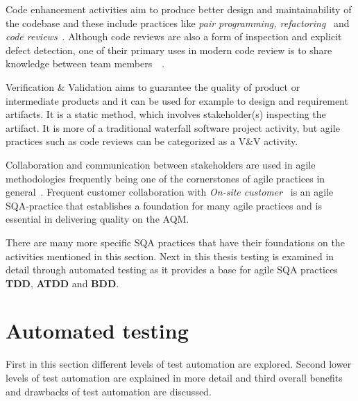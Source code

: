     Code enhancement activities aim to produce better design and maintainability of the codebase and these include practices
    like \textit{pair programming, refactoring}~\cite{huo2004software} and \textit{code reviews}~\cite{rigby2013convergent}.
    Although code reviews are also a form of inspection and explicit defect detection, one of their primary uses in modern
    code review is to share knowledge between team members~\cite{mantyla2014software}~\cite{rigby2013convergent}.

    Verification \& Validation aims to guarantee the quality of product or intermediate products and it can be used for
    example to design and requirement artifacts. It is a static method, which involves stakeholder(s)
    inspecting the artifact. It is more of a traditional waterfall software project activity, but agile practices such as code reviews
    can be categorized as a V\&V activity. ~\cite{huo2004software}

    Collaboration and communication between stakeholders are used in agile methodologies frequently being one of the
    cornerstones of agile practices in general~\cite{huo2004software}. Frequent customer collaboration with \textit{On-site customer}~\cite{huo2004software}
    is an agile SQA-practice that establishes a foundation for many agile practices and is essential in delivering
    quality on the AQM.

    There are many more specific SQA practices that have their foundations on the activities mentioned in this section.
    Next in this thesis testing is examined in detail through automated testing as it provides a base for agile SQA practices \textbf{TDD},
    \textbf{ATDD} and \textbf{BDD}.

\section{Automated testing}
    First in this section different levels of test automation are explored. Second lower levels of test automation are explained in more
    detail and third overall benefits and drawbacks of test automation are discussed.

